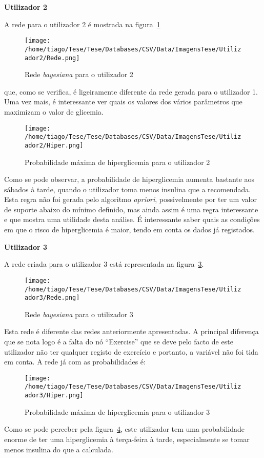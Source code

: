 \textbf{Utilizador 2}


A rede para o utilizador 2 é mostrada na figura~\ref{fig:sam2}

\begin{figure}[H]
\centering
\texttt{[image: /home/tiago/Tese/Tese/Databases/CSV/Data/ImagensTese/Utilizador2/Rede.png]}
\caption{Rede \textit{bayesiana} para o utilizador 2}
\label{fig:sam2}
\end{figure}
que, como se verifica, é ligeiramente diferente da rede gerada para o utilizador 1. Uma vez mais, é interessante ver quais os valores dos vários parâmetros que maximizam o valor de glicemia. 

\begin{figure}[H]
\centering
\texttt{[image: /home/tiago/Tese/Tese/Databases/CSV/Data/ImagensTese/Utilizador2/Hiper.png]}
\caption{Probabilidade máxima de hiperglicemia para o utilizador 2}
\label{fig:hiper2}
\end{figure}
Como se pode observar, a probabilidade de hiperglicemia aumenta bastante aos sábados à tarde, quando o utilizador toma menos insulina que a recomendada. Esta regra não foi gerada pelo algoritmo \textit{apriori}, possivelmente por ter um valor de suporte abaixo do mínimo definido, mas ainda assim é uma regra interessante e que mostra uma utilidade desta análise. É interessante saber quais as condições em que o risco de hiperglicemia é maior, tendo em conta os dados já registados. 

\textbf{Utilizador 3}

A rede criada para o utilizador 3 está representada na figura~\ref{fig:sam3}.

\begin{figure}[H]
\centering
\texttt{[image: /home/tiago/Tese/Tese/Databases/CSV/Data/ImagensTese/Utilizador3/Rede.png]}
\caption{Rede \textit{bayesiana} para o utilizador 3}
\label{fig:sam3}
\end{figure}
Esta rede é diferente das redes anteriormente apresentadas. A principal diferença que se nota logo é a falta do nó ``Exercise'' que se deve pelo facto de este utilizador não ter qualquer registo de exercício e portanto, a variável não foi tida em conta. A rede já com as probabilidades é:

\begin{figure}[H]
\centering
\texttt{[image: /home/tiago/Tese/Tese/Databases/CSV/Data/ImagensTese/Utilizador3/Hiper.png]}
\caption{Probabilidade máxima de hiperglicemia para o utilizador 3}
\label{fig:hiper3}
\end{figure}
Como se pode perceber pela figura~\ref{fig:hiper3}, este utilizador tem uma probabilidade enorme de ter uma hiperglicemia à terça-feira à tarde, especialmente se tomar menos insulina do que a calculada. 

